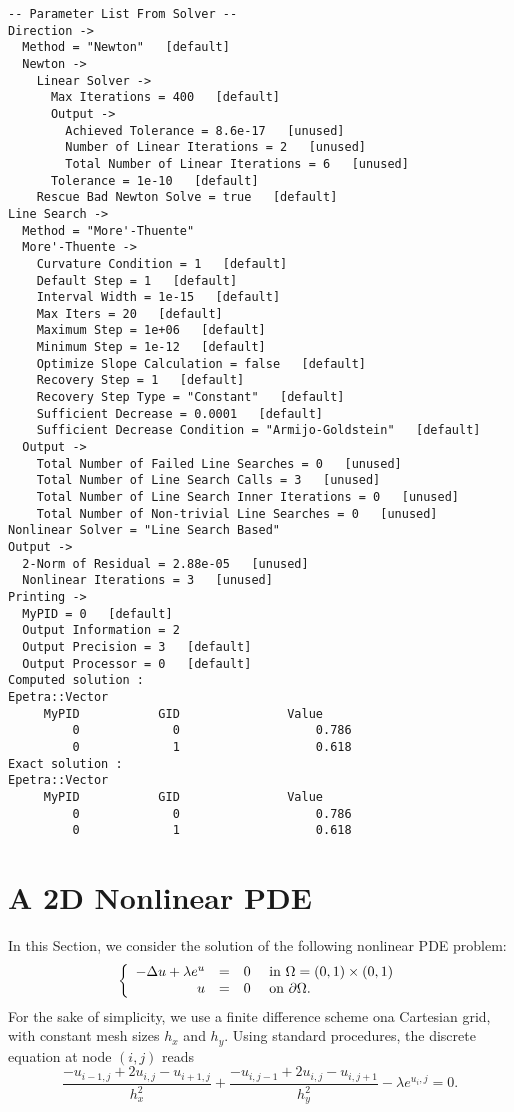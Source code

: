 \begin{verbatim}
-- Parameter List From Solver --
Direction ->
  Method = "Newton"   [default]
  Newton ->
    Linear Solver ->
      Max Iterations = 400   [default]
      Output ->
        Achieved Tolerance = 8.6e-17   [unused]
        Number of Linear Iterations = 2   [unused]
        Total Number of Linear Iterations = 6   [unused]
      Tolerance = 1e-10   [default]
    Rescue Bad Newton Solve = true   [default]
Line Search ->
  Method = "More'-Thuente"
  More'-Thuente ->
    Curvature Condition = 1   [default]
    Default Step = 1   [default]
    Interval Width = 1e-15   [default]
    Max Iters = 20   [default]
    Maximum Step = 1e+06   [default]
    Minimum Step = 1e-12   [default]
    Optimize Slope Calculation = false   [default]
    Recovery Step = 1   [default]
    Recovery Step Type = "Constant"   [default]
    Sufficient Decrease = 0.0001   [default]
    Sufficient Decrease Condition = "Armijo-Goldstein"   [default]
  Output ->
    Total Number of Failed Line Searches = 0   [unused]
    Total Number of Line Search Calls = 3   [unused]
    Total Number of Line Search Inner Iterations = 0   [unused]
    Total Number of Non-trivial Line Searches = 0   [unused]
Nonlinear Solver = "Line Search Based"
Output ->
  2-Norm of Residual = 2.88e-05   [unused]
  Nonlinear Iterations = 3   [unused]
Printing ->
  MyPID = 0   [default]
  Output Information = 2
  Output Precision = 3   [default]
  Output Processor = 0   [default]
Computed solution :
Epetra::Vector
     MyPID           GID               Value
         0             0                   0.786
         0             1                   0.618
Exact solution :
Epetra::Vector
     MyPID           GID               Value
         0             0                   0.786
         0             1                   0.618
\end{verbatim}


\section{A 2D Nonlinear PDE}
\label{sec:nox_2d}

In this Section, we consider the solution of the following nonlinear PDE
problem:
\begin{equation}
  \label{eq:nox_nonlinear_2d}
  \left\{
    \begin{array}{r c l l }
      - \Delta u + \lambda e^u & = & 0 & \mbox{ in } \Omega = (0,1)
      \times (0,1) \\
      u & = & 0 & \mbox{ on } \partial \Omega .
    \end{array}
  \right.   
\end{equation}
For the sake of simplicity, we use a finite difference scheme ona
Cartesian grid, with constant mesh sizes $h_x$ and $h_y$. Using standard
procedures, the discrete equation at node $(i,j)$ reads
\[
\frac{ - u_{i-1,j} + 2 u_{i,j} - u_{i+1,j} }{ h_x^2} +
\frac{ - u_{i,j-1} + 2 u_{i,j} - u_{i,j+1} }{ h_y^2}  -
\lambda e^{u{_i,j}} = 0 .
\]

